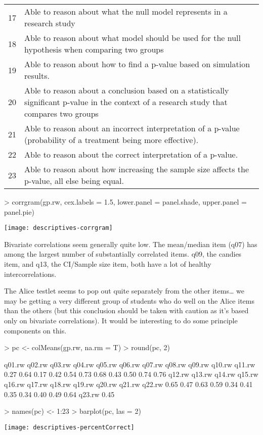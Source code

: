 \documentclass[11pt]{article}
\begin{document}
\begin{center}
\begin{tabular}{rl}
17 & Able to reason about what the null model represents in a research study\\
18 & Able to reason about what model should be used for the null hypothesis when comparing two groups\\
19 & Able to reason about how to find a p-value based on simulation results.\\
20 & Able to reason about a conclusion based on a statistically significant p-value in the context of a research study that compares two groups\\
21 & Able to reason about an incorrect interpretation of a p-value (probability of a treatment being more effective).\\
22 & Able to reason about the correct interpretation of a p-value.\\
23 & Able to reason about how increasing the sample size affects the p-value, all else being equal.\\
\end{tabular}
\end{center}

\begin{Schunk}
\begin{Sinput}
> corrgram(gp.rw, cex.labels = 1.5, lower.panel = panel.shade, upper.panel = panel.pie)
\end{Sinput}
\end{Schunk}
\texttt{[image: descriptives-corrgram]}

Bivariate correlations seem generally quite low.  The mean/median item (q07) has among the largest number of substantially correlated items.  q09, the candies item, and q13, the CI/Sample size item, both have a lot of healthy intercorrelations.

The Alice testlet seems to pop out quite separately from the other items\ldots{} we may be getting a very different group of students who do well on the Alice items than the others (but this conclusion should be taken with caution as it's based only on bivariate correlations).  It would be interesting to do some principle components on this.

\begin{Schunk}
\begin{Sinput}
> pc <- colMeans(gp.rw, na.rm = T)
> round(pc, 2)
\end{Sinput}
\begin{Soutput}
q01.rw q02.rw q03.rw q04.rw q05.rw q06.rw q07.rw q08.rw q09.rw q10.rw q11.rw 
  0.27   0.64   0.17   0.42   0.54   0.73   0.68   0.43   0.50   0.74   0.76 
q12.rw q13.rw q14.rw q15.rw q16.rw q17.rw q18.rw q19.rw q20.rw q21.rw q22.rw 
  0.65   0.47   0.63   0.59   0.34   0.41   0.35   0.34   0.40   0.49   0.64 
q23.rw 
  0.45 
\end{Soutput}
\begin{Sinput}
> names(pc) <- 1:23
> barplot(pc, las = 2)
\end{Sinput}
\end{Schunk}
\texttt{[image: descriptives-percentCorrect]}
\end{document}
